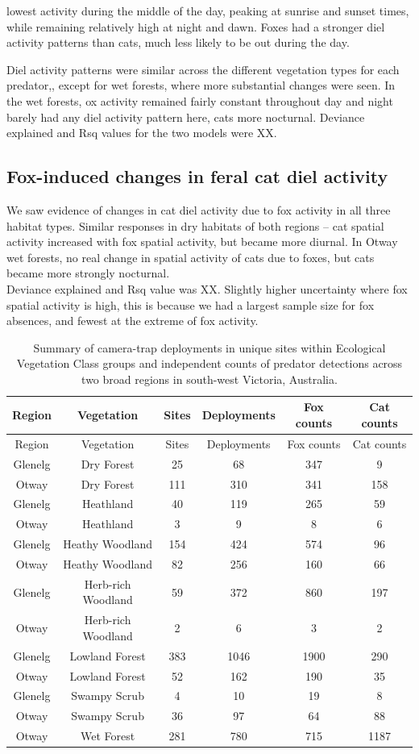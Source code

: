 \documentclass[]{elsarticle} %
\begin{document}
lowest activity during the middle of the day, peaking at sunrise and sunset times, while remaining relatively high at night and dawn.
Foxes had a stronger diel activity patterns than cats, much less likely to be out during the day.

Diel activity patterns were similar across the different vegetation types for each predator,, except for wet forests, where more substantial changes were seen. In the wet forests, ox activity remained fairly constant throughout day and night barely had any diel activity pattern here, cats more nocturnal.
Deviance explained and Rsq values for the two models were XX.

\hypertarget{fox-induced-changes-in-feral-cat-diel-activity}{%
\subsection{Fox-induced changes in feral cat diel activity}\label{fox-induced-changes-in-feral-cat-diel-activity}}

We saw evidence of changes in cat diel activity due to fox activity in all three habitat types. Similar responses in dry habitats of both regions -- cat spatial activity increased with fox spatial activity, but became more diurnal.
In Otway wet forests, no real change in spatial activity of cats due to foxes, but cats became more strongly nocturnal.\\
Deviance explained and Rsq value was XX.
Slightly higher uncertainty where fox spatial activity is high, this is because we had a largest sample size for fox absences, and fewest at the extreme of fox activity.

\newpage

\begin{longtable}[]{@{}cccccc@{}}
\caption{Summary of camera-trap deployments in unique sites within Ecological Vegetation Class groups and independent counts of predator detections across two broad regions in south-west Victoria, Australia.}\tabularnewline
\toprule
Region & Vegetation & Sites & Deployments & Fox counts & Cat counts\tabularnewline
\midrule
\endfirsthead
\toprule
Region & Vegetation & Sites & Deployments & Fox counts & Cat counts\tabularnewline
\midrule
\endhead
Glenelg & Dry Forest & 25 & 68 & 347 & 9\tabularnewline
Otway & Dry Forest & 111 & 310 & 341 & 158\tabularnewline
Glenelg & Heathland & 40 & 119 & 265 & 59\tabularnewline
Otway & Heathland & 3 & 9 & 8 & 6\tabularnewline
Glenelg & Heathy Woodland & 154 & 424 & 574 & 96\tabularnewline
Otway & Heathy Woodland & 82 & 256 & 160 & 66\tabularnewline
Glenelg & Herb-rich Woodland & 59 & 372 & 860 & 197\tabularnewline
Otway & Herb-rich Woodland & 2 & 6 & 3 & 2\tabularnewline
Glenelg & Lowland Forest & 383 & 1046 & 1900 & 290\tabularnewline
Otway & Lowland Forest & 52 & 162 & 190 & 35\tabularnewline
Glenelg & Swampy Scrub & 4 & 10 & 19 & 8\tabularnewline
Otway & Swampy Scrub & 36 & 97 & 64 & 88\tabularnewline
Otway & Wet Forest & 281 & 780 & 715 & 1187\tabularnewline
\bottomrule
\end{longtable}
\end{document}
